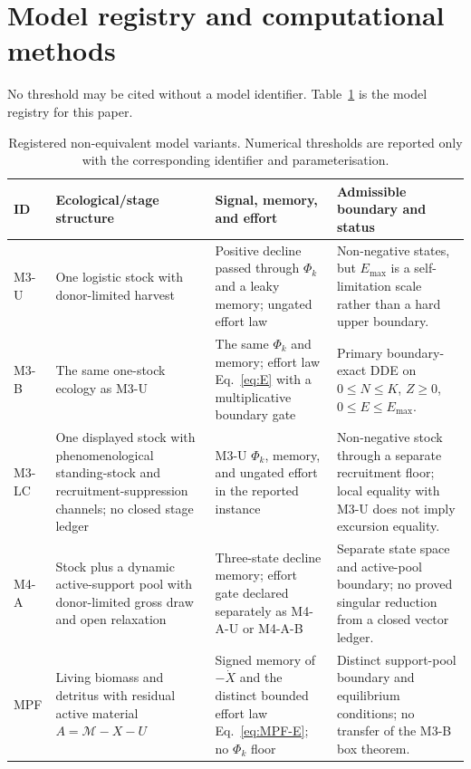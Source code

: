 \documentclass[11pt]{article}
\begin{document}
\section{Model registry and computational methods}

No threshold may be cited without a model identifier. Table~\ref{tab:registry} is the model registry for this paper.

\begin{table}[h]
\centering
\small
\caption{Registered non-equivalent model variants. Numerical thresholds are reported only with the corresponding identifier and parameterisation.}
\label{tab:registry}
\begin{tabularx}{\textwidth}{p{1.15cm}p{2.6cm}Xp{3.25cm}}
\toprule
ID & Ecological/stage structure & Signal, memory, and effort & Admissible boundary and status\\
\midrule
M3-U & One logistic stock with donor-limited harvest & Positive decline passed through $\Phi_k$ and a leaky memory; ungated effort law & Non-negative states, but $E_{\max}$ is a self-limitation scale rather than a hard upper boundary.\\
M3-B & The same one-stock ecology as M3-U & The same $\Phi_k$ and memory; effort law Eq.~\eqref{eq:E} with a multiplicative boundary gate & Primary boundary-exact DDE on $0\le N\le K$, $Z\ge0$, $0\le E\le E_{\max}$.\\
M3-LC & One displayed stock with phenomenological standing-stock and recruitment-suppression channels; no closed stage ledger & M3-U $\Phi_k$, memory, and ungated effort in the reported instance & Non-negative stock through a separate recruitment floor; local equality with M3-U does not imply excursion equality.\\
M4-A & Stock plus a dynamic active-support pool with donor-limited gross draw and open relaxation & Three-state decline memory; effort gate declared separately as M4-A-U or M4-A-B & Separate state space and active-pool boundary; no proved singular reduction from a closed vector ledger.\\
MPF & Living biomass and detritus with residual active material $A=\mathcal M-X-U$ & Signed memory of $-\dot X$ and the distinct bounded effort law Eq.~\eqref{eq:MPF-E}; no $\Phi_k$ floor & Distinct support-pool boundary and equilibrium conditions; no transfer of the M3-B box theorem.\\
\bottomrule
\end{tabularx}
\end{table}
\end{document}
